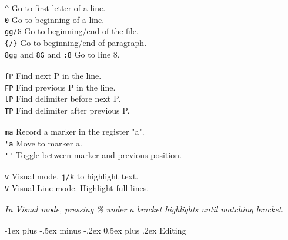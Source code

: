 \documentclass[10pt,landscape]{article}
\makeatletter
\renewcommand{\section}{\@startsection{section}{1}{0mm}%
                                {-1ex plus -.5ex minus -.2ex}%
                                {0.5ex plus .2ex}%
                                {\normalfont\large\bfseries}}
\makeatother
\begin{document}
\begin{multicols}{3}
\verb!^! \hfill Go to first letter of a line.\\
\verb!0! \hfill Go to beginning of a line.\\
\verb!gg/G! \hfill Go to beginning/end of the file.\\
\verb!{/}! \hfill Go to beginning/end of paragraph.\\ 
\verb!8gg! and \verb!8G! and \verb!:8! \hfill Go to line 8.\\
\verb! !\\
\verb!fP! \hfill Find next P in the line.\\
\verb!FP! \hfill Find previous P in the line.\\
\verb!tP! \hfill Find delimiter before next P.\\
\verb!TP! \hfill Find delimiter after previous P.\\
\verb! !\\
\verb!ma! \hfill Record a marker in the register "a".\\
\verb!'a! \hfill Move to marker a.\\
\verb!''! \hfill Toggle between marker and previous position.\\
\verb! !\\
\verb!v! \hfill Visual mode. \verb!j/k! to highlight text.\\
\verb!V! \hfill Visual Line mode. Highlight full lines.\\
\verb! !\\
\textit{In Visual mode, pressing \% under a bracket highlights until matching bracket.}\\
\verb! !\\

\section{Editing}


\end{multicols}
\end{document}
